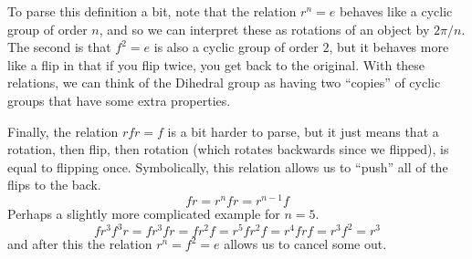   To parse this definition a bit, note that the relation $r^n = e$ behaves like a cyclic group of order $n$, and so we can interpret these as rotations of an object by $2\pi/n$. The second is that $f^2 = e$ is also a cyclic group of order $2$, but it behaves more like a flip in that if you flip twice, you get back to the original. With these relations, we can think of the Dihedral group as having two ``copies'' of cyclic groups that have some extra properties. 

  Finally, the relation $rfr = f$ is a bit harder to parse, but it just means that a rotation, then flip, then rotation (which rotates backwards since we flipped), is equal to flipping once. Symbolically, this relation allows us to ``push'' all of the flips to the back. 
  \begin{equation} 
    f r = r^n f r = r^{n-1} f
  \end{equation}
  Perhaps a slightly more complicated example for $n = 5$. 
  \begin{equation}
    f r^3 f^3 r = f r^3 f r = f r^2 f = r^5 f r^2 f = r^4 f r f = r^3 f^2 = r^3
  \end{equation}
  and after this the relation $r^n = f^2 = e$ allows us to cancel some out. 

